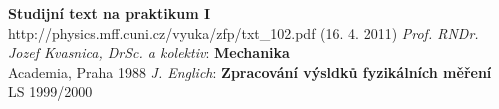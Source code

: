 \documentclass[a4paper,12pt]{article}
\begin{document}
\eject
\begin{thebibliography}{5}
         \textbf{Studijní text na praktikum I} \\http://physics.mff.cuni.cz/vyuka/zfp/txt\_102.pdf (16. 4. 2011)
         \emph{Prof. RNDr. Jozef Kvasnica, DrSc. a kolektiv}: \textbf{Mechanika}\\ Academia, Praha 1988
         \emph{J. Englich}: \textbf{Zpracování výsldků fyzikálních měření} \\ LS 1999/2000
\end{thebibliography}
\end{document}
